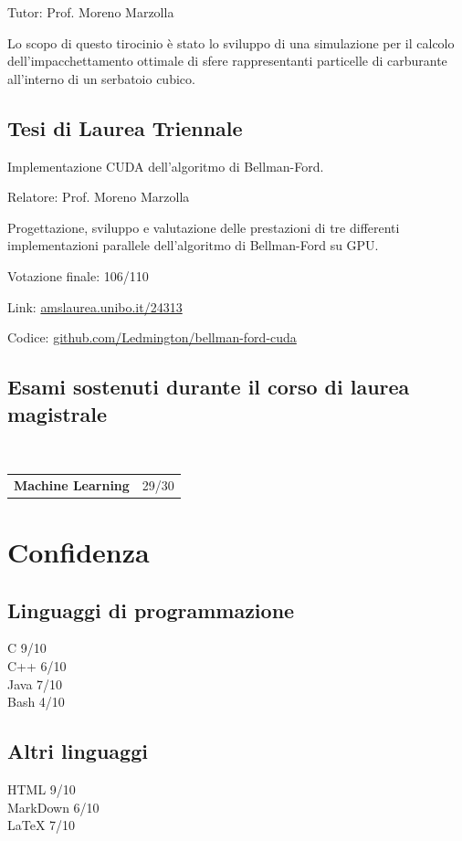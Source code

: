 \documentclass{article}
\newcommand{\https}[1]{\href{https://#1}{#1}}
\newcommand{\skill}[2]{#1 #2/10}
\begin{document}
	Tutor: Prof. Moreno Marzolla
	
	Lo scopo di questo tirocinio è stato lo sviluppo di una simulazione per il calcolo dell'impacchettamento ottimale di sfere rappresentanti particelle di carburante all'interno di un serbatoio cubico.
	
	\subsection*{Tesi di Laurea Triennale}
	Implementazione CUDA dell'algoritmo di Bellman-Ford.
	
	Relatore: Prof. Moreno Marzolla
	
	Progettazione, sviluppo e valutazione delle prestazioni di tre differenti implementazioni parallele dell'algoritmo di Bellman-Ford su GPU.
	
	Votazione finale: 106/110
	
	Link: \https{amslaurea.unibo.it/24313}
	
	Codice: \https{github.com/Ledmington/bellman-ford-cuda}
	
	\subsection*{Esami sostenuti durante il corso di laurea magistrale}
	\\
	\begin{tabular}{ll}
		\textbf{Machine Learning} & 29/30\\
	\end{tabular}
	
	\section*{Confidenza}
	\subsection*{Linguaggi di programmazione}
	\skill{C}{9}\\
	\skill{C++}{6}\\
	\skill{Java}{7}\\
	\skill{Bash}{4}
	
	\subsection*{Altri linguaggi}
	\skill{HTML}{9}\\
	\skill{MarkDown}{6}\\
	\skill{\LaTeX}{7}
	
\end{document}
